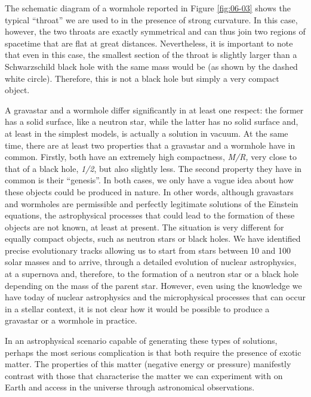 The schematic diagram of a wormhole reported in Figure \ref{fig:06-03} shows the typical
``throat'' we are used to in the presence of strong curvature. In this
case, however, the two throats are exactly symmetrical and can thus join two regions of
spacetime that are flat at great distances. Nevertheless, it is
important to note that even in this case, the smallest section of the throat is slightly
larger than a Schwarzschild black hole with the same mass would be (as
shown by the dashed white circle). Therefore, this is not a black hole but simply a very
compact object.

A gravastar and a wormhole differ significantly in at least one respect: the former has
a solid surface, like a neutron star, while the latter has no solid surface and, at
least in the simplest models, is actually a solution in vacuum. At the
same time, there are at least two properties that a gravastar and a wormhole have in
common. Firstly, both have an extremely high compactness, \emph{M/R,} very close to that
of a black hole, \emph{1/2}, but also slightly less. The second property they have in
common is their ``genesis''. In both cases, we only have a vague idea about how these
objects could be produced in nature. In other words, although gravastars and wormholes
are permissible and perfectly legitimate solutions of the Einstein equations, the
astrophysical processes that could lead to the formation of these objects are not known,
at least at present. The situation is very different for equally compact objects, such
as neutron stars or black holes. We have identified precise evolutionary tracks allowing
us to start from stars between 10 and 100 solar masses and to arrive, through a detailed
evolution of nuclear astrophysics, at a supernova and, therefore, to
the formation of a neutron star or a black hole depending on the mass of the parent
star. However, even using the knowledge we have today of nuclear astrophysics and the
microphysical processes that can occur in a stellar context, it is not clear how it
would be possible to produce a gravastar or a wormhole in practice.

In an astrophysical scenario capable of generating these types of solutions, perhaps the
most serious complication is that both require the presence of exotic
matter. The properties of this matter (negative energy or pressure)
manifestly contrast with those that characterise the matter we can experiment with on
Earth and access in the universe through astronomical observations.

